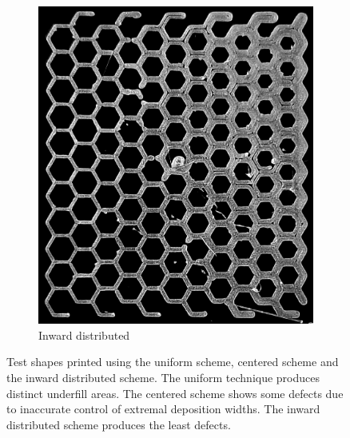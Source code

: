 \begin{figure}
\begin{subfigure}{\figwidth}
\includegraphics[height=\figheight]{sources/applications/P3_print_hex_inward_edited.png}
\caption{Inward distributed}\label{print_inward}
\end{subfigure}
\caption{
Test shapes printed using the uniform scheme, centered scheme and the inward distributed scheme.
The uniform technique produces distinct underfill areas.
The centered scheme shows some defects due to inaccurate control of extremal deposition widths.
The inward distributed scheme produces the least defects.
}
\label{prints}
\end{figure}

